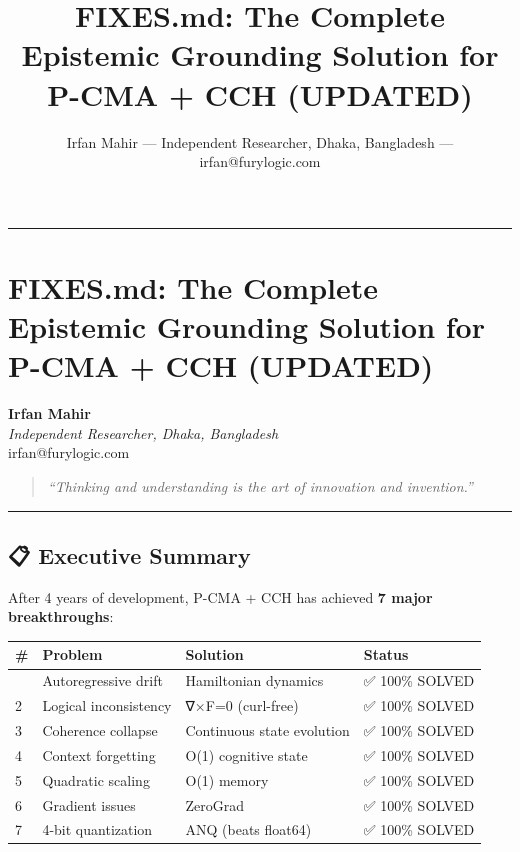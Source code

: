 \documentclass[
  11pt,
  a4paper,
]{article}
\title{FIXES.md: The Complete Epistemic Grounding Solution for P-CMA +
CCH (UPDATED)}
\author{Irfan Mahir --- Independent Researcher, Dhaka, Bangladesh ---
irfan@furylogic.com}
\date{}
\begin{document}
\maketitle

{
\hypersetup{linkcolor=}
\setcounter{tocdepth}{3}
\tableofcontents
}
\begin{center}\rule{0.5\linewidth}{0.5pt}\end{center}

\section{FIXES.md: The Complete Epistemic Grounding Solution for P-CMA +
CCH
(UPDATED)}\label{fixes.md-the-complete-epistemic-grounding-solution-for-p-cma-cch-updated}

\textbf{Irfan Mahir}\\
\emph{Independent Researcher, Dhaka, Bangladesh}\\
irfan@furylogic.com

\begin{quote}
\emph{``Thinking and understanding is the art of innovation and
invention.''}
\end{quote}

\begin{center}\rule{0.5\linewidth}{0.5pt}\end{center}

\subsection{📋 Executive Summary}\label{executive-summary}

After 4 years of development, P-CMA + CCH has achieved \textbf{7 major
breakthroughs}:

\begin{longtable}[]{@{}llll@{}}
\toprule\noalign{}
\# & Problem & Solution & Status \\
\midrule\noalign{}
\endhead
\bottomrule\noalign{}
\endlastfoot
1 & Autoregressive drift & Hamiltonian dynamics & ✅ 100\% SOLVED \\
2 & Logical inconsistency & ∇×F=0 (curl-free) & ✅ 100\% SOLVED \\
3 & Coherence collapse & Continuous state evolution & ✅ 100\% SOLVED \\
4 & Context forgetting & O(1) cognitive state & ✅ 100\% SOLVED \\
5 & Quadratic scaling & O(1) memory & ✅ 100\% SOLVED \\
6 & Gradient issues & ZeroGrad & ✅ 100\% SOLVED \\
7 & 4-bit quantization & ANQ (beats float64) & ✅ 100\% SOLVED \\
\end{longtable}
\end{document}
